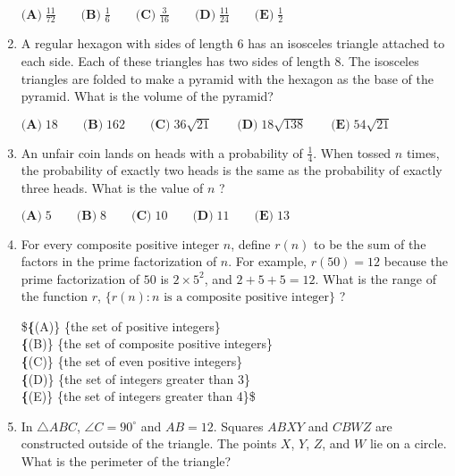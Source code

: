 \documentclass{article}
\begin{document}
\begin{enumerate}[label=\arabic*., itemsep=0.5em]
$\textbf{(A)}\; \frac{11}{72} \qquad\textbf{(B)}\; \frac{1}{6} \qquad\textbf{(C)}\; \frac{3}{16} \qquad\textbf{(D)}\; \frac{11}{24} \qquad\textbf{(E)}\; \frac{1}{2}$\par \vspace{0.5em}\item A regular hexagon with sides of length 6 has an isosceles triangle attached to each side. Each of these triangles has two sides of length 8. The isosceles triangles are folded to make a pyramid with the hexagon as the base of the pyramid. What is the volume of the pyramid?

$\textbf{(A)}\; 18 \qquad\textbf{(B)}\; 162 \qquad\textbf{(C)}\; 36\sqrt{21} \qquad\textbf{(D)}\; 18\sqrt{138} \qquad\textbf{(E)}\; 54\sqrt{21}$\par \vspace{0.5em}\item An unfair coin lands on heads with a probability of $\tfrac{1}{4}$. When tossed $n$ times, the probability of exactly two heads is the same as the probability of exactly three heads. What is the value of $n$ ?

$\textbf{(A)}\; 5 \qquad\textbf{(B)}\; 8 \qquad\textbf{(C)}\; 10 \qquad\textbf{(D)}\; 11 \qquad\textbf{(E)}\; 13$\par \vspace{0.5em}\item For every composite positive integer $n$, define $r(n)$ to be the sum of the factors in the prime factorization of $n$. For example, $r(50) = 12$ because the prime factorization of $50$ is $2 \times 5^{2}$, and $2 + 5 + 5 = 12$. What is the range of the function $r$, $\{r(n): n \text{ is a composite positive integer}\}$ ?

\$\textbf\{(A)\}\; \text\{the set of positive integers\} \\
\textbf\{(B)\}\; \text\{the set of composite positive integers\} \\
\textbf\{(C)\}\; \text\{the set of even positive integers\} \\
\textbf\{(D)\}\; \text\{the set of integers greater than 3\} \\
\textbf\{(E)\}\; \text\{the set of integers greater than 4\}\$\par \vspace{0.5em}\item In $\triangle ABC$, $\angle C = 90^\circ$ and $AB = 12$. Squares $ABXY$ and $CBWZ$ are constructed outside of the triangle. The points $X$, $Y$, $Z$, and $W$ lie on a circle. What is the perimeter of the triangle?


\end{enumerate}
\end{document}

